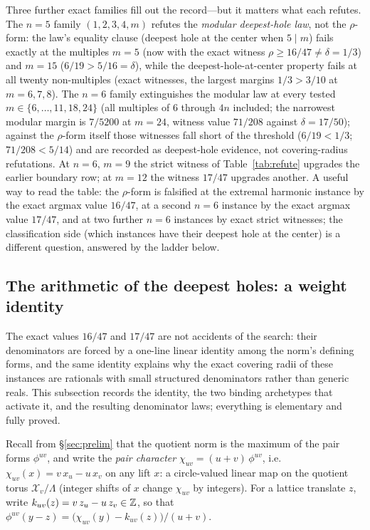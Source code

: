 Three further exact families fill out the record---but it matters what
each refutes. The $n=5$ family $(1,2,3,4,m)$ refutes the
\emph{modular deepest-hole law}, not the $\rho$-form: the law's equality
clause (deepest hole at the center when $5\mid m$) fails exactly at the
multiples $m=5$ (now with the exact witness $\rho\ge16/47\ne\delta=1/3$)
and $m=15$ ($6/19>5/16=\delta$), while the deepest-hole-at-center
property fails at all twenty non-multiples (exact witnesses, the largest
margins $1/3>3/10$ at $m=6,7,8$). The $n=6$ family extinguishes the
modular law at every tested $m\in\{6,\dots,11,18,24\}$ (all multiples of
$6$ through $4n$ included; the narrowest modular margin is $7/5200$ at
$m=24$, witness value $71/208$ against $\delta=17/50$); against the
$\rho$-form itself those witnesses fall short of the threshold
($6/19<1/3$; $71/208<5/14$) and are recorded as deepest-hole evidence,
not covering-radius refutations. At $n=6$, $m=9$ the strict witness of
Table~\ref{tab:refute} upgrades the earlier boundary row; at $m=12$ the
witness $17/47$ upgrades another. A useful way to read the table:
the $\rho$-form is falsified at the extremal harmonic instance by the
exact argmax value $16/47$, at a second $n=6$ instance by the exact
argmax value $17/47$, and at
two further $n=6$ instances by exact strict witnesses; the
classification side (which instances have their deepest hole at the
center) is a different question, answered by the ladder below.

\subsection{The arithmetic of the deepest holes: a weight identity}
\label{sec:weights}

The exact values $16/47$ and $17/47$ are not accidents of the search:
their denominators are forced by a one-line linear identity among the
norm's defining forms, and the same identity explains why the exact
covering radii of these instances are rationals with small structured
denominators rather than generic reals. This subsection records the
identity, the two binding archetypes that activate it, and the resulting
denominator laws; everything is elementary and fully proved.

Recall from \S\ref{sec:prelim} that the quotient norm is the maximum of
the pair forms $\phi^{uv}$, and write the \emph{pair character}
$\chi_{uv}=(u{+}v)\,\phi^{uv}$, i.e.\ $\chi_{uv}(x)=v\,x_u-u\,x_v$ on
any lift $x$: a circle-valued linear map on the quotient torus
$\mathcal{X}_v/\Lambda$ (integer shifts of $x$ change $\chi_{uv}$ by
integers). For a lattice translate $z$, write
$k_{uv}(z)=v\,z_u-u\,z_v\in\mathbb{Z}$, so that
$\phi^{uv}(y-z)=\bigl(\chi_{uv}(y)-k_{uv}(z)\bigr)/(u{+}v)$.

